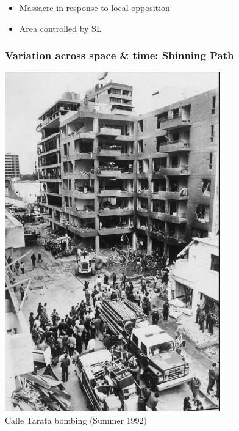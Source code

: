 \documentclass[aspectratio=43]{beamer}
\begin{document}
\begin{frame}
{\begin{minipage}{0.49\textwidth}
\begin{itemize}
  \item Massacre in response to local opposition
  \item Area controlled by SL
\end{itemize}
\end{minipage}}

\end{frame}

\begin{frame}
\frametitle{Variation across space \& time: Shinning Path}
\centering

\begin{minipage}{0.59\textwidth}\centering
\includegraphics[width = 0.7\textwidth]{img/tarata}\\
{\small Calle Tarata bombing (Summer 1992)}\\
\end{minipage}\hfill
{}

\end{frame}
\end{document}
